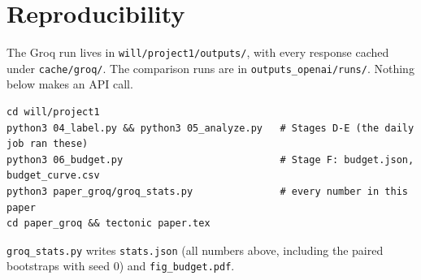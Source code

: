 \documentclass[11pt]{article}
\newcommand{\code}[1]{\texttt{#1}}
\begin{document}
\appendix
\section{Reproducibility}

The Groq run lives in \code{will/project1/outputs/}, with every response cached under
\code{cache/groq/}. The comparison runs are in \code{outputs\_openai/runs/}. Nothing below
makes an API call.

\begin{verbatim}
cd will/project1
python3 04_label.py && python3 05_analyze.py   # Stages D-E (the daily job ran these)
python3 06_budget.py                           # Stage F: budget.json, budget_curve.csv
python3 paper_groq/groq_stats.py               # every number in this paper
cd paper_groq && tectonic paper.tex
\end{verbatim}

\code{groq\_stats.py} writes \code{stats.json} (all numbers above, including the paired
bootstraps with seed 0) and \code{fig\_budget.pdf}.
\end{document}
